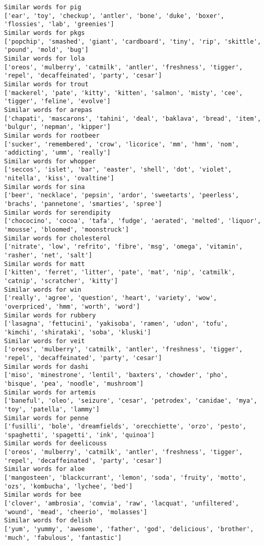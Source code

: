 \documentclass[11pt]{article}
\begin{document}
\begin{Verbatim}[commandchars=\\\{\}]
Similar words for pig
['ear', 'toy', 'checkup', 'antler', 'bone', 'duke', 'boxer', 'flossies', 'lab', 'greenies']
Similar words for pkgs
['popchip', 'smashed', 'giant', 'cardboard', 'tiny', 'rip', 'skittle', 'pound', 'mold', 'bug']
Similar words for lola
['oreos', 'mulberry', 'catmilk', 'antler', 'freshness', 'tigger', 'repel', 'decaffeinated', 'party', 'cesar']
Similar words for trout
['mackerel', 'pate', 'kitty', 'kitten', 'salmon', 'misty', 'cee', 'tigger', 'feline', 'evolve']
Similar words for arepas
['chapati', 'mascarons', 'tahini', 'deal', 'baklava', 'bread', 'item', 'bulgur', 'nepman', 'kipper']
Similar words for rootbeer
['sucker', 'remembered', 'crow', 'licorice', 'mm', 'hmm', 'nom', 'addicting', 'umm', 'really']
Similar words for whopper
['seccos', 'islet', 'bar', 'easter', 'shell', 'dot', 'violet', 'nitella', 'kiss', 'ovaltine']
Similar words for sina
['beer', 'necklace', 'pepsin', 'ardor', 'sweetarts', 'peerless', 'brachs', 'pannetone', 'smarties', 'spree']
Similar words for serendipity
['chococino', 'cocoa', 'tafa', 'fudge', 'aerated', 'melted', 'liquor', 'mousse', 'bloomed', 'moonstruck']
Similar words for cholesterol
['nitrate', 'low', 'refrito', 'fibre', 'msg', 'omega', 'vitamin', 'rasher', 'net', 'salt']
Similar words for matt
['kitten', 'ferret', 'litter', 'pate', 'mat', 'nip', 'catmilk', 'catnip', 'scratcher', 'kitty']
Similar words for win
['really', 'agree', 'question', 'heart', 'variety', 'wow', 'overpriced', 'hmm', 'worth', 'word']
Similar words for rubbery
['lasagna', 'fettucini', 'yakisoba', 'ramen', 'udon', 'tofu', 'kimchi', 'shirataki', 'soba', 'kluski']
Similar words for veit
['oreos', 'mulberry', 'catmilk', 'antler', 'freshness', 'tigger', 'repel', 'decaffeinated', 'party', 'cesar']
Similar words for dashi
['miso', 'minestrone', 'lentil', 'baxters', 'chowder', 'pho', 'bisque', 'pea', 'noodle', 'mushroom']
Similar words for artemis
['baneful', 'oleo', 'seizure', 'cesar', 'petrodex', 'canidae', 'mya', 'toy', 'patella', 'lammy']
Similar words for penne
['fusilli', 'bole', 'dreamfields', 'orecchiette', 'orzo', 'pesto', 'spaghetti', 'spagetti', 'ink', 'quinoa']
Similar words for deelicouss
['oreos', 'mulberry', 'catmilk', 'antler', 'freshness', 'tigger', 'repel', 'decaffeinated', 'party', 'cesar']
Similar words for aloe
['mangosteen', 'blackcurrant', 'lemon', 'soda', 'fruity', 'motto', 'ozs', 'kombucha', 'lychee', 'bed']
Similar words for bee
['clover', 'ambrosia', 'comvia', 'raw', 'lacquat', 'unfiltered', 'wound', 'mead', 'cheerio', 'molasses']
Similar words for delish
['yum', 'yummy', 'awesome', 'father', 'god', 'delicious', 'brother', 'much', 'fabulous', 'fantastic']

\end{Verbatim}
\end{document}
